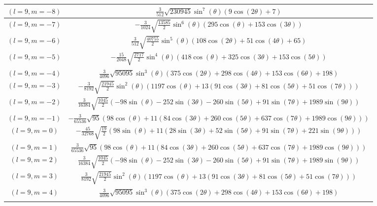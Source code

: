 \begin{center}
\begin{longtable}{|c|c|}
$(l=9, m=-8)$ & $\frac{3}{512} \sqrt{230945} \sin ^7(\theta ) (9 \cos (2 \theta )+7)$ \\ \hline
\rowcolor{gray!15}
$(l=9, m=-7)$ & $-\frac{3}{1024} \sqrt{\frac{13585}{2}} \sin ^6(\theta ) (295 \cos (\theta )+153 \cos (3 \theta ))$ \\ \hline
$(l=9, m=-6)$ & $\frac{3}{512} \sqrt{\frac{40755}{2}} \sin ^5(\theta ) (108 \cos (2 \theta )+51 \cos (4 \theta )+65)$ \\ \hline
\rowcolor{gray!15}
$(l=9, m=-5)$ & $-\frac{15}{2048} \sqrt{\frac{2717}{2}} \sin ^4(\theta ) (418 \cos (\theta )+325 \cos (3 \theta )+153 \cos (5 \theta ))$ \\ \hline
$(l=9, m=-4)$ & $\frac{3}{4096} \sqrt{95095} \sin ^3(\theta ) (375 \cos (2 \theta )+298 \cos (4 \theta )+153 \cos (6 \theta )+198)$ \\ \hline
\rowcolor{gray!15}
$(l=9, m=-3)$ & $-\frac{3}{8192} \sqrt{\frac{21945}{2}} \sin ^2(\theta ) (1197 \cos (\theta )+13 (91 \cos (3 \theta )+81 \cos (5 \theta )+51 \cos (7 \theta )))$ \\ \hline
$(l=9, m=-2)$ & $\frac{3}{16384} \sqrt{\frac{1045}{2}} (-98 \sin (\theta )-252 \sin (3 \theta )-260 \sin (5 \theta )+91 \sin (7 \theta )+1989 \sin (9 \theta ))$ \\ \hline
\rowcolor{gray!15}
$(l=9, m=-1)$ & $-\frac{3}{65536} \sqrt{95} (98 \cos (\theta )+11 (84 \cos (3 \theta )+260 \cos (5 \theta )+637 \cos (7 \theta )+1989 \cos (9 \theta )))$ \\ \hline
$(l=9, m=0)$ & $-\frac{45}{32768} \sqrt{\frac{19}{2}} (98 \sin (\theta )+11 (28 \sin (3 \theta )+52 \sin (5 \theta )+91 \sin (7 \theta )+221 \sin (9 \theta )))$ \\ \hline
\rowcolor{gray!15}
$(l=9, m=1)$ & $\frac{3}{65536} \sqrt{95} (98 \cos (\theta )+11 (84 \cos (3 \theta )+260 \cos (5 \theta )+637 \cos (7 \theta )+1989 \cos (9 \theta )))$ \\ \hline
$(l=9, m=2)$ & $\frac{3}{16384} \sqrt{\frac{1045}{2}} (-98 \sin (\theta )-252 \sin (3 \theta )-260 \sin (5 \theta )+91 \sin (7 \theta )+1989 \sin (9 \theta ))$ \\ \hline
\rowcolor{gray!15}
$(l=9, m=3)$ & $\frac{3}{8192} \sqrt{\frac{21945}{2}} \sin ^2(\theta ) (1197 \cos (\theta )+13 (91 \cos (3 \theta )+81 \cos (5 \theta )+51 \cos (7 \theta )))$ \\ \hline
$(l=9, m=4)$ & $\frac{3}{4096} \sqrt{95095} \sin ^3(\theta ) (375 \cos (2 \theta )+298 \cos (4 \theta )+153 \cos (6 \theta )+198)$ \\ \hline
\rowcolor{gray!15}

\end{longtable}
\end{center}
